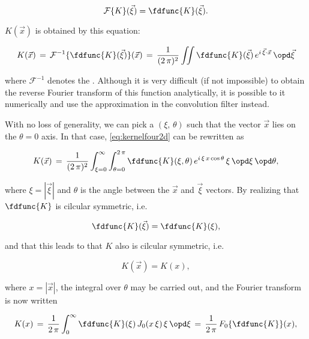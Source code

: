 \begin{equation}
\mathcal{F}\{K\}(\vec{\xi}) = \fdfunc{K}(\vec{\xi}).
\end{equation}

$K(\vec{x})$ is obtained by  this equation:

\begin{equation} \label{eq:kernelfour2d}
K(\vec{x})\, = \,\mathcal{F}^{-1}\{\fdfunc{K}(\vec{\xi})\}(\vec{x})\, = \,\frac{1}{(2\,\pi)^2}\iint\fdfunc{K}(\vec{\xi})\,e^{i\,\vec{\xi}\cdot\vec{x}}\,\opd\vec{\xi}
\end{equation}

where $\mathcal{F}^{-1}$ denotes the . Although it is very difficult (if not impossible) to obtain the reverse Fourier transform of this function analytically, it is possible to  it numerically and use the approximation in the convolution filter instead.

With no loss of generality, we can pick a  $(\xi,\,\theta)$ such that the vector $\vec{x}$ lies on the $\theta = 0$ axis. In that case, \eqref{eq:kernelfour2d} can be rewritten as

\begin{equation}
K(\vec{x})\, = \,\frac{1}{(2\,\pi)^2}\int_{\xi=0}^\infty\int_{\theta=0}^{2\,\pi}\fdfunc{K}(\xi, \theta)\,e^{i\,\xi\,x\cos\theta}\,\xi\,\opd\xi\,\opd\theta,
\end{equation}

where $\xi = |\vec{\xi}|$ and $\theta$ is the angle between the $\vec{x}$ and $\vec{\xi}$ vectors. By realizing that $\fdfunc{K}$ is cilcular symmetric, i.e.

\begin{equation}
\fdfunc{K}(\vec{\xi}) = \fdfunc{K}(\xi),
\end{equation}

and that this leads to that $K$ also is cilcular symmetric, i.e.

\begin{equation}
K(\vec{x}) = K(x),
\end{equation}

where $x = |\vec{x}|$, the integral over $\theta$ may be carried out, and the Fourier transform is now written

\begin{equation} \label{eq:fdkerneltokernel}
K(x)\, = \,\frac{1}{2\,\pi}\int_0^\infty\fdfunc{K}(\xi)\,J_0(x\,\xi)\,\xi\,\opd\xi\, = \,\frac{1}{2\,\pi}\,F_0\{\fdfunc{K}\}(x),
\end{equation}

